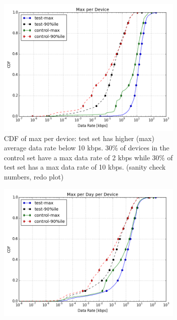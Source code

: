 \begin{figure}[ht!]
\begin{minipage}{0.90\linewidth}
\centering
%
\begin{subfigure}[b]{0.90\linewidth}
\includegraphics[width=\linewidth]{figures/cdf-max-per-device.png}
  \caption{CDF of max per device: test set has higher (max) average data rate below 10 kbps.  30\% of devices in the control set have a max data rate of 2 kbps while 30\% of test set has a max data rate of 10 kbps. (sanity check numbers, redo plot)}
  \label{fig:CDF-data-rate-max}
\end{subfigure}
%
\vspace{-1em}
%
\begin{subfigure}[b]{0.90\linewidth}
\includegraphics[width=\linewidth]{figures/cdf-max-per-day-per-device.png}

\end{subfigure}
\end{minipage}
\end{figure}
